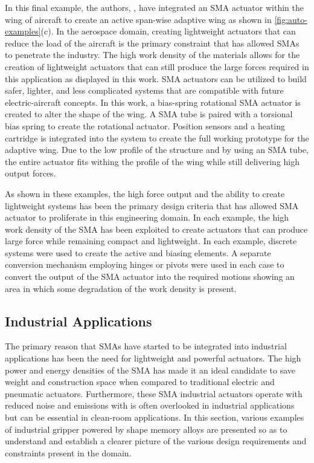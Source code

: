 In this final example, the authors, \cite{benafanRecentAdvancementsRotary2019a}, have integrated an SMA actuator within the wing of aircraft to create an active span-wise adaptive wing as shown in \cref{fig:auto-examples}(c). In the aerospace domain, creating lightweight actuators that can reduce the load of the aircraft is the primary constraint that has allowed SMAs to penetrate the industry. The high work density of the materials allows for the creation of lightweight actuators that can still produce the large forces required in this application as displayed in this work. SMA actuators can be utilized to build safer, lighter, and less complicated systems that are compatible with future electric-aircraft concepts. In this work, a bias-spring rotational SMA actuator is created to alter the shape of the wing. A SMA tube is paired with a torsional bias spring to create the rotational actuator. Position sensors and a heating cartridge is integrated into the system to create the full working prototype for the adaptive wing. Due to the low profile of the structure and by using an SMA tube, the entire actuator fits withing the profile of the wing while still delivering high output forces.

As shown in these examples, the high force output and the ability to create lightweight systems has been the primary design criteria that has allowed SMA actuator to proliferate in this engineering domain. In each example, the high work density of the SMA has been exploited to create actuators that can produce large force while remaining compact and lightweight. In each example, discrete systems were used to create the active and biasing elements. A separate conversion mechanism employing hinges or pivots were used in each case to convert the output of the SMA actuator into the required motions showing an area in which some degradation of the work density is present.

\subsection{Industrial Applications}
The primary reason that SMAs have started to be integrated into industrial applications has been the need for lightweight and powerful actuators. The high power and energy densities of the SMA has made it an ideal candidate to save weight and construction space when compared to traditional electric and pneumatic actuators. Furthermore, these SMA industrial actuators operate with reduced noise and emissions with is often overlooked in industrial applications but can be essential in clean-room applications. In this section, various examples of industrial gripper powered by shape memory alloys are presented so as to understand and establish a clearer picture of the various design requirements and constraints present in the domain.

